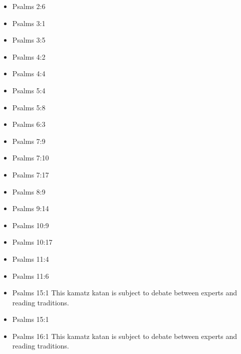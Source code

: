 \documentclass[14pt]{book}
\begin{document}
\begin{multicols}{2}
	\begin{itemize} \item Psalms 2:6
		
		\item Psalms 3:1

\item Psalms 3:5

\item Psalms 4:2

\item Psalms 4:4

\item Psalms 5:4

\item Psalms 5:8

\item Psalms 6:3

\item Psalms 7:9

\item Psalms 7:10

\item Psalms 7:17

\item Psalms 8:9

\item Psalms 9:14

\item Psalms 10:9

\item Psalms 10:17

\item Psalms 11:4

\item Psalms 11:6

\item Psalms 15:1 This kamatz katan is subject to debate between experts and reading traditions.

\item Psalms 15:1

\item Psalms 16:1 This kamatz katan is subject to debate between experts and reading traditions.


\end{itemize}
\end{multicols}
\end{document}
